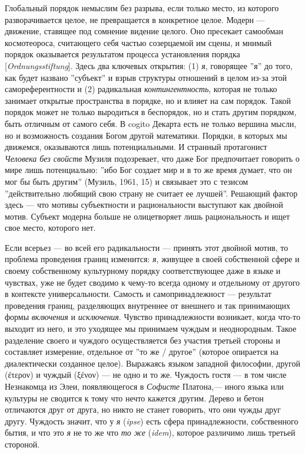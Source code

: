 \documentclass[12pt]{book}
\begin{document}
Глобальный порядок немыслим без разрыва, если только место, из которого разворачивается целое, не превращается в конкретное целое. Модерн --- движение, ставящее под сомнение видение целого. Оно пресекает самообман космотеороса, считающего себя частью созерцаемой им сцены, и мнимый порядок оказывается результатом процесса установления порядка [\textit{Ordnungsstiftung}]. Здесь два ключевых открытия: (1) \textit{я}, говорящее ''я'' до того, как будет названо ''субъект'' и взрыв структуры отношений в целом из-за этой самореферентности и (2) радикальная \textit{контингентность}, которая не только занимает открытые пространства в порядке, но и влияет на сам порядок. Такой порядок может не только выродиться в беспорядок, но и стать другим порядком, быть отличным от самого себя. В cogito Декарта есть не только вершина мысли, но и возможность создания Богом другой математики. Порядки, в которых мы движемся, оказываются лишь потенциальными. И странный протагонист \textit{Человека без свойств} Музиля подозревает, что даже Бог предпочитает говорить о мире лишь потенциально: ''ибо Бог создает мир и в то же время думает, что он мог бы быть другим'' (Музиль, 1961, 15) и связывает это с тезисом ''действительно любящий свою страну не считает ее лучшей''. Решающий фактор здесь --- что мотивы субъектности и рациональности выступают как двойной мотив. Субъект модерна больше не олицетворяет лишь рациональность и ищет свое место, которого нет.

Если всерьез --- во всей его радикальности --- принять этот двойной мотив, то проблема проведения границ изменится: \textit{я}, живущее в своей собственной сфере и своему собственному культурному порядку соответствующее даже в языке и чувствах, уже не будет сводимо к чему-то всегда одному и отдельному от другого в контексте универсальности. Самость и самопринадлежност --- результат проведения границ, разделяющих внутреннее от внешнего и так принимающих формы \textit{включения} и \textit{исключения}. Чувство принадлежности возникает, когда что-то выходит из него, и это уходящее мы принимаем чуждым и неоднородным. Такое разделение своего и чуждого осуществляется без участия третьей стороны и составляет измерение, отдельное от ''то же / другое'' (которое опирается на диалектически созданное целое). Выражаясь языком западной философии, другой (έτερον) и чуждый (ξένον) --- не одно и то же. Чуждость гостя --- в том числе Незнакомца из Элеи, появляющегося в \textit{Софисте} Платона,--- иного языка или культуры не сводится к тому что нечто кажется другим. Дерево и бетон отличаются друг от друга, но никто не станет говорить, что они чужды друг другу. Чуждость значит, что у \textit{я} (\textit{ipse}) есть сфера принадлежности, собственного бытия, и что это \textit{я} не то же что \textit{то же} (\textit{idem}), которое различимо лишь третьей стороной.
\end{document}
